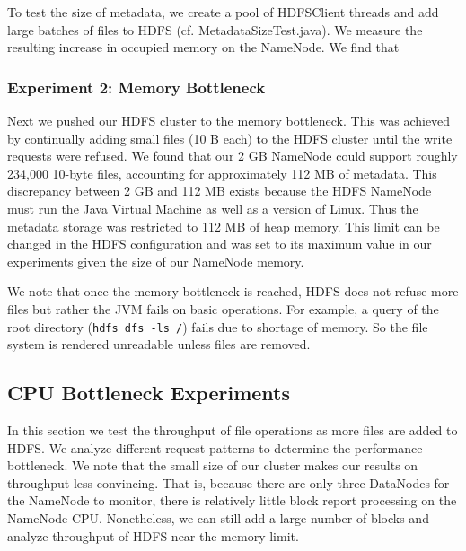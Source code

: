 \documentclass[11pt, a4paper]{article}
\begin{document}
\begin{multicols*}{2}
To test the size of metadata, we create a pool of HDFSClient threads and add large batches of files to HDFS (cf. MetadataSizeTest.java). We measure the resulting increase in occupied memory on the NameNode. We find that 

\subsubsection{Experiment 2: Memory Bottleneck}\label{MemoryBottleneck}
Next we pushed our HDFS cluster to the memory bottleneck. This was achieved by continually adding small files (10 B each) to the HDFS cluster until the write requests were refused. We found that our 2 GB NameNode could support roughly 234,000 10-byte files, accounting for approximately 112 MB of metadata. This discrepancy between 2 GB and 112 MB exists because the HDFS NameNode must run the Java Virtual Machine as well as a version of Linux. Thus the metadata storage was restricted to 112 MB of heap memory. This limit can be changed in the HDFS configuration and was set to its maximum value in our experiments given the size of our NameNode memory.

We note that once the memory bottleneck is reached, HDFS does not refuse more files but rather the JVM fails on basic operations. For example, a query of the root directory (\texttt{hdfs dfs -ls /}) fails due to shortage of memory. So the file system is rendered unreadable unless files are removed.

\subsection{CPU Bottleneck Experiments}\label{CPUBottleneck}
In this section we test the throughput of file operations as more files are added to HDFS. We analyze different request patterns to determine the performance bottleneck. We note that the small size of our cluster makes our results on throughput less convincing. That is, because there are only three DataNodes for the NameNode to monitor, there is relatively little block report processing on the NameNode CPU. Nonetheless, we can still add a large number of blocks and analyze throughput of HDFS near the memory limit.

\end{multicols*}
\end{document}
